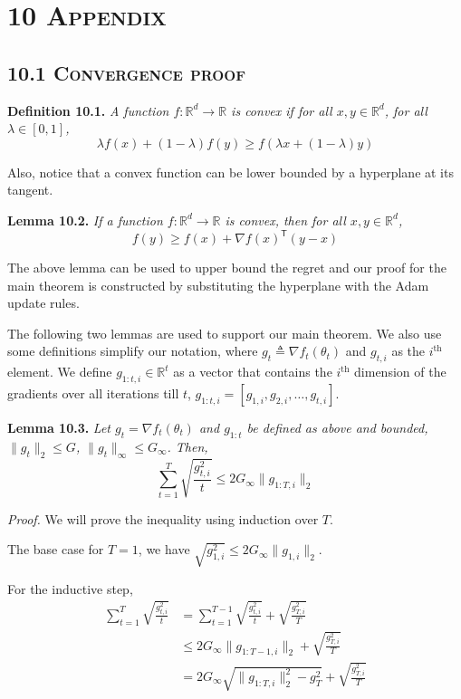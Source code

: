 \documentclass[11pt]{article}
\begin{document}
\section*{10 \textsc{Appendix}}

\subsection*{10.1 \textsc{Convergence proof}}

\noindent\textbf{Definition 10.1.} \emph{A function
$f : \mathbb{R}^d \to \mathbb{R}$ is convex if for all
$x, y \in \mathbb{R}^d$, for all $\lambda \in [0, 1]$,}
\[
\lambda f(x) + (1 - \lambda) f(y) \geq f(\lambda x + (1 - \lambda) y)
\]

\noindent
Also, notice that a convex function can be lower bounded by a
hyperplane at its tangent.

\noindent\textbf{Lemma 10.2.} \emph{If a function
$f : \mathbb{R}^d \to \mathbb{R}$ is convex, then for all
$x, y \in \mathbb{R}^d$,}
\[
f(y) \geq f(x) + \nabla f(x)^\mathsf{T}(y - x)
\]

\noindent
The above lemma can be used to upper bound the regret and our
proof for the main theorem is constructed by substituting the
hyperplane with the Adam update rules.

The following two lemmas are used to support our main theorem.
We also use some definitions simplify our notation, where
$g_t \triangleq \nabla f_t(\theta_t)$ and $g_{t,i}$ as the
$i^\text{th}$ element. We define $g_{1:t,i} \in \mathbb{R}^t$ as
a vector that contains the $i^\text{th}$ dimension of the
gradients over all iterations till $t$,
$g_{1:t,i} = [g_{1,i}, g_{2,i}, \ldots, g_{t,i}]$.

\noindent\textbf{Lemma 10.3.} \emph{Let $g_t = \nabla f_t(\theta_t)$
and $g_{1:t}$ be defined as above and bounded,
$\|g_t\|_2 \leq G$, $\|g_t\|_\infty \leq G_\infty$. Then,}
\[
\sum_{t=1}^{T} \sqrt{\frac{g_{t,i}^2}{t}} \leq 2 G_\infty \|g_{1:T,i}\|_2
\]

\noindent\emph{Proof.} We will prove the inequality using
induction over $T$.

The base case for $T = 1$, we have
$\sqrt{g_{1,i}^2} \leq 2 G_\infty \|g_{1,i}\|_2$.

For the inductive step,
\begin{align*}
\sum_{t=1}^{T} \sqrt{\frac{g_{t,i}^2}{t}}
 &= \sum_{t=1}^{T-1} \sqrt{\frac{g_{t,i}^2}{t}} + \sqrt{\frac{g_{T,i}^2}{T}} \\
 &\leq 2 G_\infty \|g_{1:T-1,i}\|_2 + \sqrt{\frac{g_{T,i}^2}{T}} \\
 &= 2 G_\infty \sqrt{\|g_{1:T,i}\|_2^2 - g_T^2} + \sqrt{\frac{g_{T,i}^2}{T}}
\end{align*}
\end{document}

